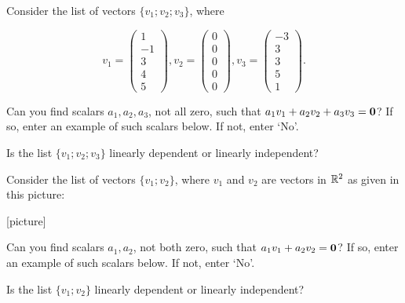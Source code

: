 Consider the list of vectors $\{v_1; v_2; v_3\}$, where

\[v_1 = \left(\begin{array}{c} 1 \\ -1  \\ 3 \\ 4 \\5 \end{array} \right), 
v_2 = \left(\begin{array}{c} 0 \\ 0  \\ 0 \\ 0 \\ 0 \end{array} \right),  
v_3 = \left(\begin{array}{c} -3 \\ 3  \\ 3 \\ 5 \\ 1 \end{array} \right). \]

Can you find scalars $a_1, a_2, a_3$, not all zero, such that 
$a_1v_1 + a_2 v_2 + a_3 v_3 = \mathbf{0}$?  If so, enter an example of such scalars below.
If not, enter `No'.  



Is the list $\{v_1; v_2; v_3\}$ linearly dependent or linearly independent?  


\edXsolution{ 
}


\endedxproblem




Consider the list of vectors $\{v_1; v_2\}$, where $v_1$ and $v_2$ are
vectors in $\mathbb R^2$ as given in this picture:

[picture]

Can you find scalars $a_1, a_2$, not both zero, such that 
$a_1v_1 + a_2 v_2 = \mathbf{0}$?  If so, enter an example of such scalars below.
If not, enter `No'.  



Is the list $\{v_1; v_2\}$ linearly dependent or linearly independent?  


\edXsolution{ 
}


